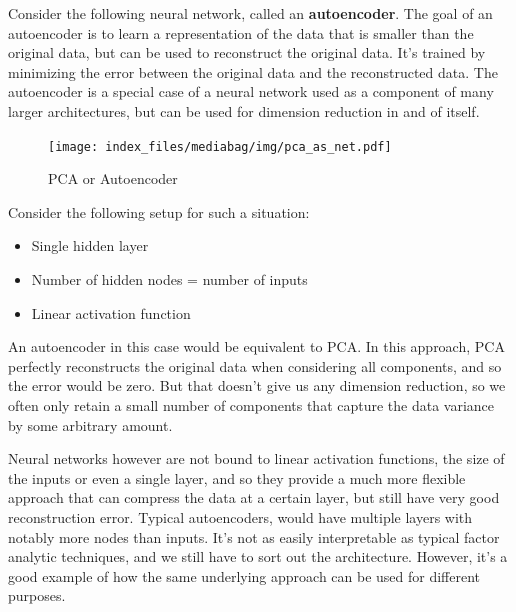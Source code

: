 \documentclass[
  letterpaper,
]{krantz}
\providecommand{\tightlist}{%
  \setlength{\itemsep}{0pt}\setlength{\parskip}{0pt}}\usepackage{longtable,booktabs,array}
\begin{document}
Consider the following neural network, called an \textbf{autoencoder}.
The goal of an autoencoder is to learn a representation of the data that
is smaller than the original data, but can be used to reconstruct the
original data. It's trained by minimizing the error between the original
data and the reconstructed data. The autoencoder is a special case of a
neural network used as a component of many larger architectures, but can
be used for dimension reduction in and of itself.

\begin{figure}

{\centering \texttt{[image: index\_files/mediabag/img/pca\_as\_net.pdf]}

}

\caption{PCA or Autoencoder}

\end{figure}

Consider the following setup for such a situation:

\begin{itemize}
\tightlist
\item
  Single hidden layer
\item
  Number of hidden nodes = number of inputs
\item
  Linear activation function
\end{itemize}

An autoencoder in this case would be equivalent to PCA. In this
approach, PCA perfectly reconstructs the original data when considering
all components, and so the error would be zero. But that doesn't give us
any dimension reduction, so we often only retain a small number of
components that capture the data variance by some arbitrary amount.

Neural networks however are not bound to linear activation functions,
the size of the inputs or even a single layer, and so they provide a
much more flexible approach that can compress the data at a certain
layer, but still have very good reconstruction error. Typical
autoencoders, would have multiple layers with notably more nodes than
inputs. It's not as easily interpretable as typical factor analytic
techniques, and we still have to sort out the architecture. However,
it's a good example of how the same underlying approach can be used for
different purposes.
\end{document}
